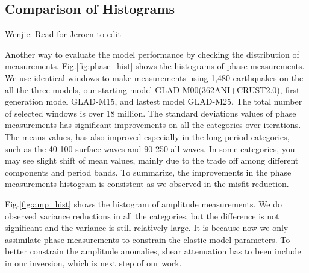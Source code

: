 \documentclass[extra,mreferee]{gji}
\begin{document}
\subsection{Comparison of Histograms}

{\color{Red} Wenjie: Read for Jeroen to edit}

Another way to evaluate the model performance by checking the distribution
of measurements. Fig.\ref{fig:phase_hist} shows the histograms of phase
measurements. We use identical windows to make measurements using 1,480
earthquakes on the all the three models, our starting model
GLAD-M00(362ANI+CRUST2.0), first generation model GLAD-M15,
and lastest model GLAD-M25. The total number of selected windows is over
18 million. The standard deviations values of phase measurements has
significant improvements on all the categories over iterations.
The means values, has also improved especially in the long period categories,
such as the 40-100 surface waves and 90-250 all waves. In some categories,
you may see slight shift of mean values, mainly due to the trade off among
different components and period bands. To summarize, the improvements in
the phase measurements histogram is consistent as we observed in the
misfit reduction.

Fig.\ref{fig:amp_hist} shows the histogram of amplitude measurements. We do
observed variance reductions in all the categories, but the difference is
not significant and the variance is still relatively large.
It is because now we only assimilate phase measurements to
constrain the elastic model parameters. To better constrain the amplitude
anomalies, shear attenuation has to been include in our inversion, which is
next step of our work.
\end{document}
